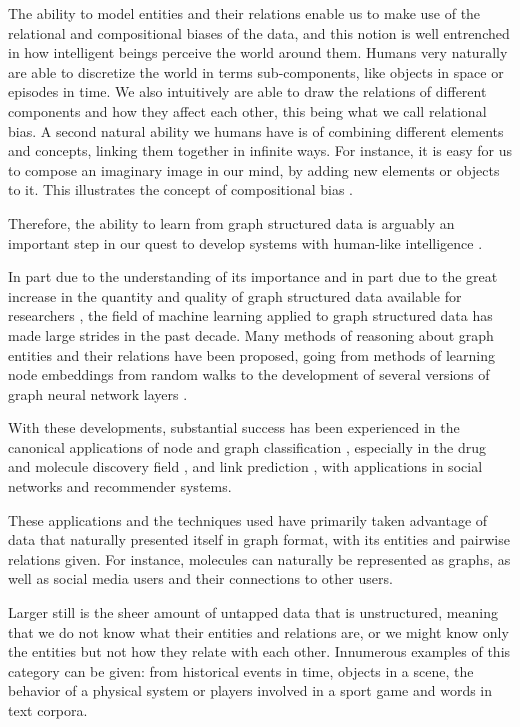 \documentclass[12pt,a4paper]{article}
\begin{document}
	The ability to model entities and their relations enable us to make use of the relational and compositional biases of the data, and this notion is well entrenched in how intelligent beings perceive the world around them. Humans very naturally are able to discretize the world in terms sub-components, like objects in space or episodes in time. We also intuitively are able to draw the relations of different components and how they affect each other, this being what we call relational bias. A second natural ability we humans have is of combining different elements and concepts, linking them together in infinite ways. For instance, it is easy for us to compose an imaginary image in our mind, by adding new elements or objects to it. This illustrates the concept of compositional bias \citep{Battaglia2018, Kipf2020}.

	Therefore, the ability to learn from graph structured data is arguably an important step in our quest to develop systems with human-like intelligence \citep{Battaglia2018}.

	In part due to the understanding of its importance and in part due to the great increase in the quantity and quality of graph structured data available for researchers \citep{Hamilton2020}, the field of machine learning applied to graph structured data has made large strides in the past decade. Many methods of reasoning about graph entities and their relations have been proposed, going from methods of learning node embeddings from random walks \citep{Perozzi2014, Grover2016} to the development of several versions of graph neural network layers \citep{Scarcelli2009, KipfandWelling2016, Gilmer2017, Battaglia2018}.

	With these developments, substantial success has been experienced in the canonical applications of node and graph classification \citep{KipfandWelling2017}, especially in the drug and molecule discovery field \citep{Gilmer2017}, and link prediction \citep{KipfandWelling2016}, with applications in social networks and recommender systems.

	These applications and the techniques used have primarily taken advantage of data that naturally presented itself in graph format, with its entities and pairwise relations given. For instance, molecules can naturally be represented as graphs, as well as social media users and their connections to other users.

	Larger still is the sheer amount of untapped data that is unstructured, meaning that we do not know what their entities and relations are, or we might know only the entities but not how they relate with each other. Innumerous examples of this category can be given: from historical events in time, objects in a scene, the behavior of a physical system or players involved in a sport game and words in text corpora.
\end{document}
